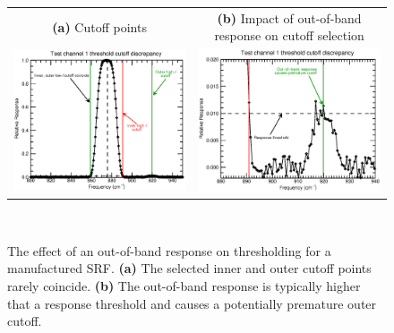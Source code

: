 \begin{figure}[H]
  \centering
  \begin{tabular}{c c}
    \textsf{\textbf{(a)} Cutoff points} &
    \textsf{\textbf{(b)} Impact of out-of-band response on cutoff selection} \\
    \includegraphics[bb= 0 15 404 300,clip,scale=0.6]{graphics/threshold_oobr.eps} &
    \includegraphics[bb=19 15 400 300,clip,scale=0.6]{graphics/threshold_oobr-zoom.eps} 
  \end{tabular} \\
  \caption{The effect of an out-of-band response on thresholding for a manufactured SRF. \textbf{(a)} The selected inner and outer cutoff points rarely coincide. \textbf{(b)} The out-of-band response is typically higher that a response threshold and causes a potentially premature outer cutoff.}
  \label{fig:threshold_oobr}
\end{figure}

